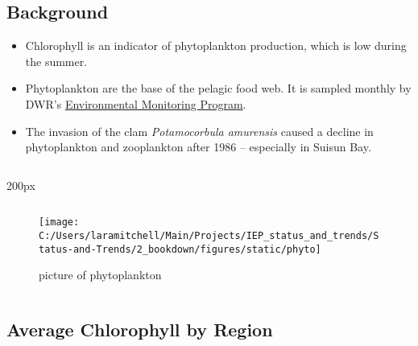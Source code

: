 \documentclass[
]{book}
\providecommand{\tightlist}{%
  \setlength{\itemsep}{0pt}\setlength{\parskip}{0pt}}
\begin{document}
\begin{columns-nocenter}

\begin{column}{0.7\textwidth}
\begin{column}

\hypertarget{background-2}{%
\subsection{Background}\label{background-2}}

\begin{itemize}
\tightlist
\item
  Chlorophyll is an indicator of phytoplankton production, which is low during the summer.
\item
  Phytoplankton are the base of the pelagic food web. It is sampled monthly by DWR's \href{https://emp.baydeltalive.com/wiki/12297}{Environmental Monitoring Program}.
\item
  The invasion of the clam \emph{Potamocorbula amurensis} caused a decline in phytoplankton and zooplankton after 1986 -- especially in Suisun Bay.
\end{itemize}

\end{column}
\end{column}

\begin{column}{200px\textwidth}
\begin{column}

\begin{figure}

{\centering \texttt{[image: C:/Users/laramitchell/Main/Projects/IEP\_status\_and\_trends/Status-and-Trends/2\_bookdown/figures/static/phyto]} 

}

\caption{picture of phytoplankton}\label{fig:unnamed-chunk-61}
\end{figure}

\end{column}
\end{column}

\end{columns-nocenter}

\hypertarget{average-chlorophyll-by-region}{%
\subsection{Average Chlorophyll by Region}\label{average-chlorophyll-by-region}}
\end{document}
